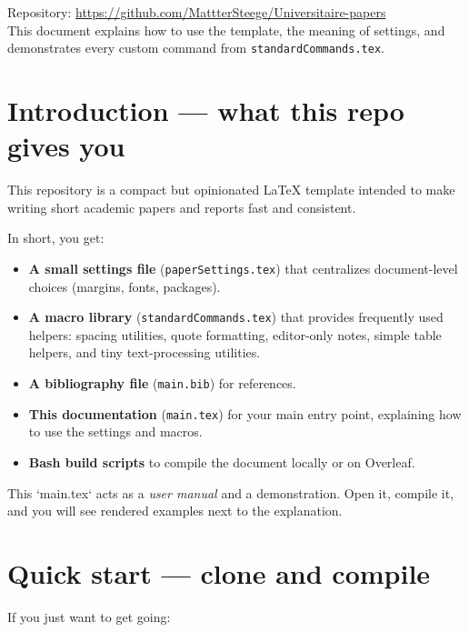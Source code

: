 \documentclass[nonacm, sigconf, balance=true]{acmart}
\begin{document}

    \begin{center}
        \small
        Repository: \url{https://github.com/MattterSteege/Universitaire-papers} \\
        This document explains how to use the template, the meaning of settings,
        and demonstrates every custom command from \texttt{standardCommands.tex}.
    \end{center}

    \vmed
    \clearpage

    \onecolumn



    \section{Introduction — what this repo gives you}
    This repository is a compact but opinionated LaTeX template intended to make writing short academic papers and reports fast and consistent.

    In short, you get:
    \begin{itemize}
        \item \textbf{A small settings file} (\texttt{paperSettings.tex}) that centralizes document-level choices (margins, fonts, packages).
        \item \textbf{A macro library} (\texttt{standardCommands.tex}) that provides frequently used helpers: spacing utilities, quote formatting, editor-only notes, simple table helpers, and tiny text-processing utilities.
        \item \textbf{A bibliography file} (\texttt{main.bib}) for references.
        \item \textbf{This documentation} (\texttt{main.tex}) for your main entry point, explaining how to use the settings and macros.
        \vmed
        \item \textbf{Bash build scripts} to compile the document locally or on Overleaf.
    \end{itemize}

    This `main.tex` acts as a \emph{user manual} and a demonstration. Open it, compile it, and you will see rendered examples next to the explanation.



    \section{Quick start — clone and compile}
    If you just want to get going:
\end{document}
